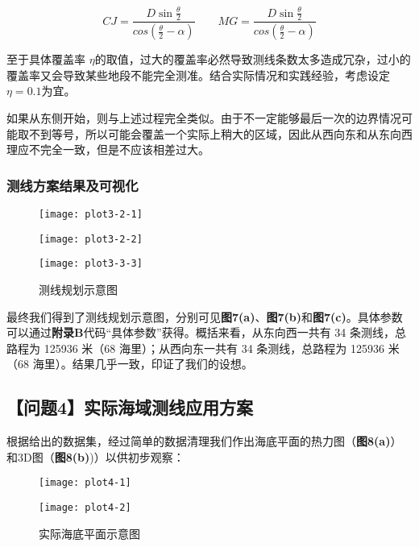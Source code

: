 \documentclass{cumcmthesis}
\begin{document}
\begin{equation}
CJ= \frac{D \sin \frac{\theta}{2}}{cos(\frac{\theta}{2} - \alpha)} \qquad MG= \frac{D \sin \frac{\theta}{2}}{cos(\frac{\theta}{2} - \alpha)}
\label{q:eq3-2}
\end{equation}

至于具体覆盖率 $\eta$的取值，过大的覆盖率必然导致测线条数太多造成冗杂，过小的覆盖率又会导致某些地段不能完全测准。结合实际情况和实践经验，考虑设定 $\eta = 0.1$为宜。

如果从东侧开始，则与上述过程完全类似。由于不一定能够最后一次的边界情况可能取不到等号，所以可能会覆盖一个实际上稍大的区域，因此从西向东和从东向西理应不完全一致，但是不应该相差过大。
\subsubsection{测线方案结果及可视化}
\begin{figure}
    \centering
    \begin{minipage}[c]{0.3\textwidth}
        \centering
        \texttt{[image: plot3-2-1]}
    \end{minipage}
    \begin{minipage}[c]{0.3\textwidth}
        \centering
        \texttt{[image: plot3-2-2]}
    \end{minipage}
    \begin{minipage}[c]{0.3\textwidth}
        \centering
        \texttt{[image: plot3-3-3]}
    \end{minipage}
    \caption{测线规划示意图}
\end{figure}
最终我们得到了测线规划示意图，分别可见\textbf{图7(a)}、\textbf{图7(b)}和\textbf{图7(c)}。具体参数可以通过\textbf{附录B}代码“具体参数”获得。概括来看，从东向西一共有 34 条测线，总路程为 125936 米（68 海里）；从西向东一共有 34 条测线，总路程为 125936 米（68 海里）。结果几乎一致，印证了我们的设想。


\subsection{【问题4】实际海域测线应用方案}
根据给出的数据集，经过简单的数据清理我们作出海底平面的热力图（\textbf{图8(a)}）和3D图（\textbf{图8(b)})）以供初步观察：
\begin{figure}[htbp]
    \centering
    \begin{minipage}{0.45\textwidth}
        \centering
        \texttt{[image: plot4-1]}
    \end{minipage}
    \hfill
    \begin{minipage}{0.45\textwidth}
        \centering
        \texttt{[image: plot4-2]}
    \end{minipage}
    \caption{实际海底平面示意图}
\end{figure}
\end{document}
